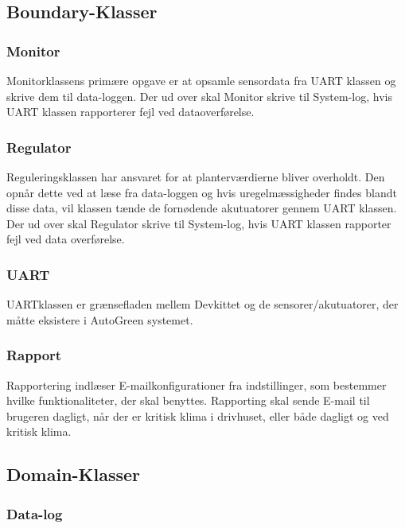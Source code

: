 \subsection{Boundary-Klasser}

\subsubsection{Monitor}

Monitorklassens primære opgave er at opsamle sensordata fra UART klassen og skrive dem til data-loggen. Der ud over skal Monitor skrive til System-log, hvis UART klassen rapporterer fejl ved dataoverførelse.

\subsubsection{Regulator}

Reguleringsklassen har ansvaret for at planterværdierne bliver overholdt. Den opnår dette ved at læse fra data-loggen og hvis uregelmæssigheder findes blandt disse data, vil klassen tænde de fornødende akutuatorer gennem UART klassen. Der ud over skal Regulator skrive til System-log, hvis UART klassen rapporter fejl ved data overførelse.

\subsubsection{UART}

UARTklassen er grænsefladen mellem Devkittet og de sensorer/akutuatorer, der måtte eksistere i AutoGreen systemet.

\subsubsection{Rapport}

Rapportering indlæser E-mailkonfigurationer fra indstillinger, som bestemmer hvilke funktionaliteter, der skal benyttes. Rapporting skal sende E-mail til brugeren dagligt, når der er kritisk klima i drivhuset, eller både dagligt og ved kritisk klima. 

\subsection{Domain-Klasser}

\subsubsection{Data-log}

